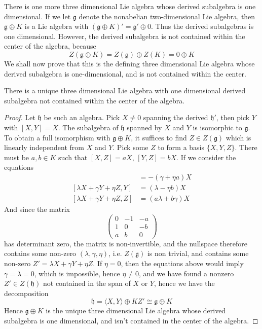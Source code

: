 There is one more three dimensional Lie algebra whose derived subalgebra is one dimensional. If we let $\mathfrak{g}$ denote the nonabelian two-dimensional Lie algebra, then $\mathfrak{g} \oplus K$ is a Lie algebra with $(\mathfrak{g} \oplus K)' = \mathfrak{g}' \oplus 0$. Thus the derived subalgebras is one dimensional. However, the derived subalgebra is not contained within the center of the algebra, because
%
\[ Z(\mathfrak{g} \oplus K) = Z(\mathfrak{g}) \oplus Z(K) = 0 \oplus K \]
%
We shall now prove that this is the defining three dimensional Lie algebra whose derived subalgebra is one-dimensional, and is not contained within the center.

\begin{theorem}
    There is a unique three dimensional Lie algebra with one dimensional derived subalgebra not contained within the center of the algebra.
\end{theorem}
\begin{proof}
    Let $\mathfrak{h}$ be such an algebra. Pick $X \neq 0$ spanning the derived $\mathfrak{h}'$, then pick $Y$ with $[X,Y] = X$. The subalgebra of $\mathfrak{h}$ spanned by $X$ and $Y$ is isomorphic to $\mathfrak{g}$. To obtain a full isomorphism with $\mathfrak{g} \oplus K$, it suffices to find $Z \in Z(\mathfrak{g})$ which is linearly independent from $X$ and $Y$. Pick some $Z$ to form a basis $\{ X, Y, Z \}$. There must be $a, b \in K$ such that $[X,Z] = aX$, $[Y,Z] = bX$. If we consider the equations
    \begin{align*}
        [\lambda X + \gamma Y + \eta Z, X] &= -(\gamma + \eta a) X\\
        [\lambda X + \gamma Y + \eta Z, Y] &= (\lambda - \eta b) X\\
        [\lambda X + \gamma Y + \eta Z, Z] &= (a \lambda + b \gamma) X
    \end{align*}
    And since the matrix 
    \[ \begin{pmatrix} 0 & -1 & -a \\ 1 & 0 & -b \\ a & b & 0 \end{pmatrix} \]
    has determinant zero, the matrix is non-invertible, and the nullspace therefore contains some non-zero $(\lambda, \gamma, \eta)$, i.e. $Z(\mathfrak{g})$ is non trivial, and contains some non-zero $Z' = \lambda X + \gamma Y + \eta Z$. If $\eta = 0$, then the equations above would imply $\gamma = \lambda = 0$, which is impossible, hence $\eta \neq 0$, and we have found a nonzero $Z' \in Z(\mathfrak{h})$ not contained in the span of $X$ or $Y$, hence we have the decomposition
    \[ \mathfrak{h} = \langle X, Y \rangle \oplus KZ' \cong \mathfrak{g} \oplus K \]
    Hence $\mathfrak{g} \oplus K$ is the unique three dimensional Lie algebra whose derived subalgebra is one dimensional, and isn't contained in the center of the algebra.
\end{proof}

